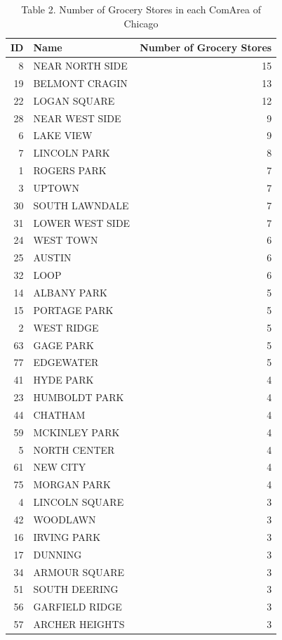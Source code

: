 \documentclass[
]{article}
\begin{document}
\begin{table}
\centering\centering
\caption{\label{tab:unnamed-chunk-4}Table 2.
Number of Grocery Stores in each ComArea of Chicago}
\centering
\begin{tabular}[t]{r|l|r}
\hline
ID & Name & Number of Grocery Stores\\
\hline
8 & NEAR NORTH SIDE & 15\\
\hline
19 & BELMONT CRAGIN & 13\\
\hline
22 & LOGAN SQUARE & 12\\
\hline
28 & NEAR WEST SIDE & 9\\
\hline
6 & LAKE VIEW & 9\\
\hline
7 & LINCOLN PARK & 8\\
\hline
1 & ROGERS PARK & 7\\
\hline
3 & UPTOWN & 7\\
\hline
30 & SOUTH LAWNDALE & 7\\
\hline
31 & LOWER WEST SIDE & 7\\
\hline
24 & WEST TOWN & 6\\
\hline
25 & AUSTIN & 6\\
\hline
32 & LOOP & 6\\
\hline
14 & ALBANY PARK & 5\\
\hline
15 & PORTAGE PARK & 5\\
\hline
2 & WEST RIDGE & 5\\
\hline
63 & GAGE PARK & 5\\
\hline
77 & EDGEWATER & 5\\
\hline
41 & HYDE PARK & 4\\
\hline
23 & HUMBOLDT PARK & 4\\
\hline
44 & CHATHAM & 4\\
\hline
59 & MCKINLEY PARK & 4\\
\hline
5 & NORTH CENTER & 4\\
\hline
61 & NEW CITY & 4\\
\hline
75 & MORGAN PARK & 4\\
\hline
4 & LINCOLN SQUARE & 3\\
\hline
42 & WOODLAWN & 3\\
\hline
16 & IRVING PARK & 3\\
\hline
17 & DUNNING & 3\\
\hline
34 & ARMOUR SQUARE & 3\\
\hline
51 & SOUTH DEERING & 3\\
\hline
56 & GARFIELD RIDGE & 3\\
\hline
57 & ARCHER HEIGHTS & 3\\

\end{tabular}
\end{table}
\end{document}
